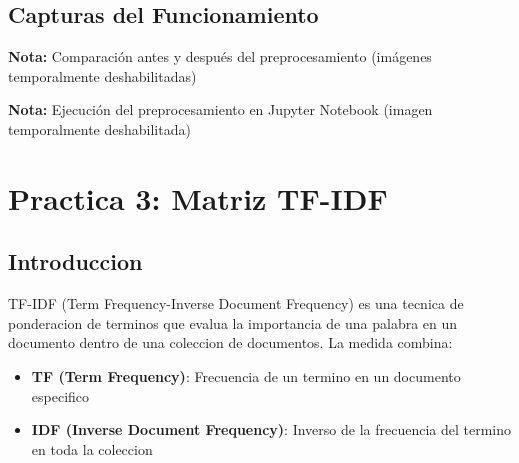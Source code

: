 \documentclass[12pt,a4paper]{article}
\begin{document}
\subsection{Capturas del Funcionamiento}


\textbf{Nota:} Comparación antes y después del preprocesamiento (imágenes temporalmente deshabilitadas)


\textbf{Nota:} Ejecución del preprocesamiento en Jupyter Notebook (imagen temporalmente deshabilitada)

\newpage

\section{Practica 3: Matriz TF-IDF}

\subsection{Introduccion}

TF-IDF (Term Frequency-Inverse Document Frequency) es una tecnica de ponderacion de terminos que evalua la importancia de una palabra en un documento dentro de una coleccion de documentos. La medida combina:

\begin{itemize}
    \item \textbf{TF (Term Frequency)}: Frecuencia de un termino en un documento especifico
    \item \textbf{IDF (Inverse Document Frequency)}: Inverso de la frecuencia del termino en toda la coleccion
\end{itemize}
\end{document}
